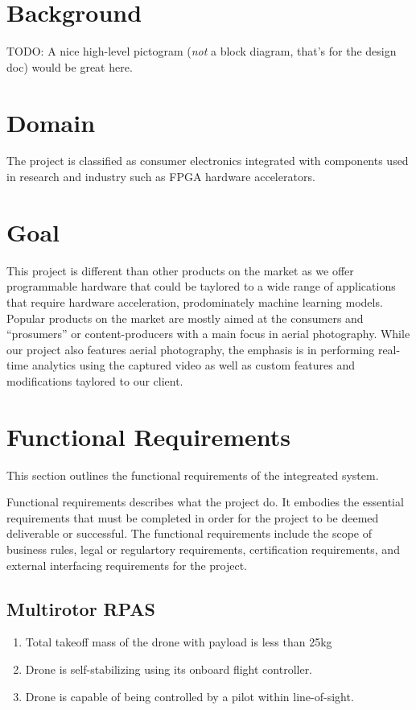 \documentclass[10pt,letterpaper]{article}
\begin{document}
\section{Background}

% 
% 

TODO: A nice high-level pictogram (\textit{not} a block diagram, that's for the design doc) would be great here.

\section{Domain}

The project is classified as consumer electronics integrated with components used in research and industry such as FPGA hardware accelerators. 

\section{Goal}

This project is different than other products on the market as we offer programmable hardware that could be taylored to a wide range of applications that require hardware acceleration, prodominately machine learning models. Popular products on the market are mostly aimed at the consumers and ``prosumers'' or content-producers with a main focus in aerial photography. While our project also features aerial photography, the emphasis is in performing real-time analytics using the captured video as well as custom features and modifications taylored to our client.

\section{Functional Requirements}\label{section:funcreq}

This section outlines the functional requirements of the integreated system.

Functional requirements describes what the project do. It embodies the essential requirements that must be completed in order for the project to be deemed deliverable or successful. The functional requirements include the scope of business rules, legal or regulartory requirements, certification requirements, and external interfacing requirements for the project.

\subsection{Multirotor RPAS}
\begin{enumerate}[{F.DR}.1:]
	\item Total takeoff mass of the drone with payload is less than 25kg
	\item Drone is self-stabilizing using its onboard flight controller.
	\item Drone is capable of being controlled by a pilot within line-of-sight.

\end{enumerate}
\end{document}
